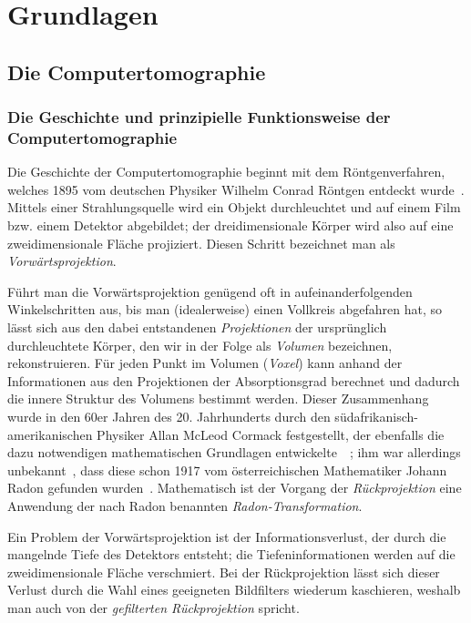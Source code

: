 \chapter{Grundlagen}

\section{Die Computertomographie}

\subsection{Die Geschichte und prinzipielle Funktionsweise der Computertomographie}

Die Geschichte der Computertomographie beginnt mit dem Röntgenverfahren, welches 1895 vom deutschen Physiker Wilhelm
Conrad Röntgen entdeckt wurde~\cite{roentgen}. Mittels einer Strahlungsquelle wird ein Objekt durchleuchtet und auf
einem Film bzw. einem Detektor abgebildet; der dreidimensionale Körper wird also auf eine zweidimensionale Fläche
projiziert. Diesen Schritt bezeichnet man als \textit{Vorwärtsprojektion}.

Führt man die Vorwärtsprojektion genügend oft in aufeinanderfolgenden Winkelschritten aus, bis man (idealerweise) einen
Vollkreis abgefahren hat, so lässt sich aus den dabei entstandenen \textit{Projektionen} der ursprünglich durchleuchtete
Körper, den wir in der Folge als \textit{Volumen} bezeichnen, rekonstruieren. Für jeden Punkt im Volumen
(\textit{Voxel}) kann anhand der Informationen aus den Projektionen der Absorptionsgrad berechnet und dadurch die
innere Struktur des Volumens bestimmt werden. Dieser Zusammenhang wurde in den 60er Jahren des 20. Jahrhunderts durch
den südafrikanisch-amerikanischen Physiker Allan McLeod Cormack festgestellt, der ebenfalls die dazu notwendigen
mathematischen Grundlagen entwickelte~\cite{cormack63}~\cite{cormack64}; ihm war allerdings unbekannt~\cite{cormack79},
dass diese schon 1917 vom österreichischen Mathematiker Johann Radon gefunden wurden~\cite{radon}. Mathematisch ist der
Vorgang der \textit{Rückprojektion} eine Anwendung der nach Radon benannten \textit{Radon-Transformation}.

Ein Problem der Vorwärtsprojektion ist der Informationsverlust, der durch die mangelnde Tiefe des Detektors entsteht;
die Tiefeninformationen werden auf die zweidimensionale Fläche {\glqq}verschmiert{\grqq}. Bei der Rückprojektion lässt
sich dieser Verlust durch die Wahl eines geeigneten Bildfilters wiederum kaschieren, weshalb man auch von der
\textit{gefilterten Rückprojektion} spricht.

